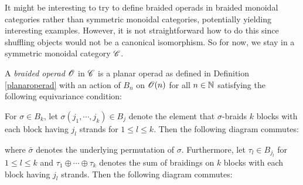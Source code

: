     It might be interesting to try to define braided operads in braided monoidal
    categories rather than symmetric monoidal categories, potentially yielding
    interesting examples. However, it is not straightforward how to do this since
    shuffling objects would not be a canonical isomorphism. So for now, we stay
    in a symmetric monoidal category $\mathscr{C}$.

\begin{defin}\label{def-br-operad} A {\em braided operad} $\mathscr{O}$ in $\mathscr{C}$ is a
    planar operad as defined in Definition \ref{planaroperad} with an action of
    $B_n$ on $\mathscr{O}(n)$ for all $n \in \mathbb{N}$ satisfying the following equivariance
    condition: 
    
    For $\sigma \in B_k$, let $\sigma(j_1, \cdots, j_k) \in B_j$
    denote the element that $\sigma$-braids $k$ blocks with each block having
    $j_l$ strands for $1 \leq l \leq k$. Then the following diagram commutes:
    \begin{center}
    \end{center}      
    where $\bar{\sigma}$ denotes the underlying permutation of $\sigma$.
    Furthermore, let $\tau_l \in B_{j_l}$ for $1 \leq l \leq k$ and
    $\tau_1 \oplus \cdots \oplus \tau_k$ denotes the sum of braidings on
    $k$ blocks with each block having $j_l$ strands. Then the following
    diagram commutes:
    \begin{center}
    \end{center}
\end{defin}

